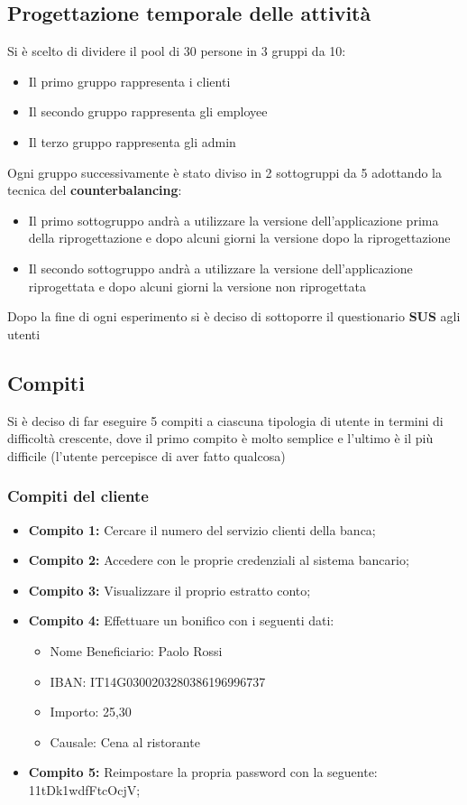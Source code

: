 \subsection{Progettazione temporale delle attività}
Si è scelto di dividere il pool di 30 persone in 3 gruppi da 10:
\begin{itemize}
	\item Il primo gruppo rappresenta i clienti
	\item Il secondo gruppo rappresenta gli employee
	\item Il terzo gruppo rappresenta gli admin
\end{itemize} 

\noindent
Ogni gruppo successivamente è stato diviso in 2 sottogruppi da 5 adottando la tecnica del \textbf{counterbalancing}:
\begin{itemize}
	\item Il primo sottogruppo andrà a utilizzare la versione dell'applicazione prima della riprogettazione e dopo alcuni giorni la versione dopo la riprogettazione
	\item Il secondo sottogruppo andrà a utilizzare la versione dell'applicazione riprogettata e dopo alcuni giorni la versione non riprogettata
\end{itemize}

\noindent
Dopo la fine di ogni esperimento si è deciso di sottoporre il questionario \textbf{SUS} agli utenti 

\subsection{Compiti}
Si è deciso di far eseguire 5 compiti a ciascuna tipologia di utente in termini di difficoltà crescente, dove il primo compito è molto semplice e l'ultimo è il più difficile (l'utente percepisce di aver fatto qualcosa)

\subsubsection{Compiti del cliente}
\begin{itemize}
	\item \textbf{Compito 1:} Cercare il numero del servizio clienti della banca;
	\item \textbf{Compito 2:} Accedere con le proprie credenziali al sistema bancario;
	\item \textbf{Compito 3:} Visualizzare il proprio estratto conto; 
	\item \textbf{Compito 4:} Effettuare un bonifico con i seguenti dati: 
		\begin{itemize}
			\item Nome Beneficiario: Paolo Rossi
			\item IBAN: IT14G0300203280386196996737
			\item Importo: 25,30
			\item Causale: Cena al ristorante 
		\end{itemize}
	\item \textbf{Compito 5:} Reimpostare la propria password con la seguente: 11tDk1wdfFtcOcjV; 
\end{itemize}

